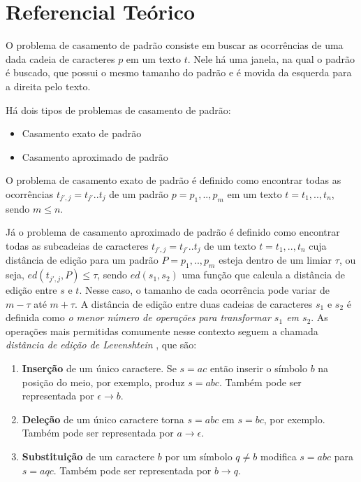 \chapter{Referencial Teórico}\label{sec:ref_teorico}

O problema de casamento de padrão consiste em buscar as ocorrências de uma dada cadeia de caracteres $p$ em um texto $t$. Nele há uma janela, na qual o padrão é buscado, que possui o mesmo tamanho do padrão e é movida da esquerda para a direita pelo texto.

Há dois tipos de problemas de casamento de padrão:
\begin{itemize}
    \item Casamento exato de padrão
    \item Casamento aproximado de padrão
\end{itemize}

O problema de casamento exato de padrão é definido como encontrar todas as ocorrências $t_{j',j} = t_{j'}..t_{j}$ de um padrão $p = p_{1},..,p_{m}$ em um texto $t = t_{1},..,t_{n}$, sendo $m \leq n$.

Já o problema de casamento aproximado de padrão é definido como encontrar todas as subcadeias de caracteres $t_{j',j} = t_{j'}..t_{j}$ de um texto $t = t_{1},..,t_{n}$ cuja distância de edição para um padrão $P = p_{1},..,p_{m}$ esteja dentro de um limiar $\tau$, ou seja, $ed(t_{j',j}, P) \leq \tau$, sendo $ed(s_{1}, s_{2})$ uma função que calcula a distância de edição entre $s$ e $t$. Nesse caso, o tamanho de cada ocorrência pode variar de $m - \tau$ até $m + \tau$. A distância de edição entre duas cadeias de caracteres $s_{1}$ e $s_{2}$ é definida como \textit{o menor número de operações para transformar $s_{1}$ em $s_{2}$}. As operações mais permitidas comumente nesse contexto seguem a chamada \textit{distância de edição de Levenshtein} \citep{levenshtein1966binary}, que são:

\begin{enumerate}
    \item \textbf{Inserção} de um único caractere. Se $s = ac$ então inserir o símbolo $b$ na posição do meio, por exemplo, produz $s = abc$. Também pode ser representada por $\epsilon \to b$.
    \item \textbf{Deleção} de um único caractere torna $s = abc$ em $s = bc$, por exemplo. Também pode ser representada por $a \to \epsilon$.
    \item \textbf{Substituição} de um caractere $b$ por um símbolo $q \neq b$ modifica  $s = abc$ para $s = aqc$. Também pode ser representada por $b \to q$.
\end{enumerate}

